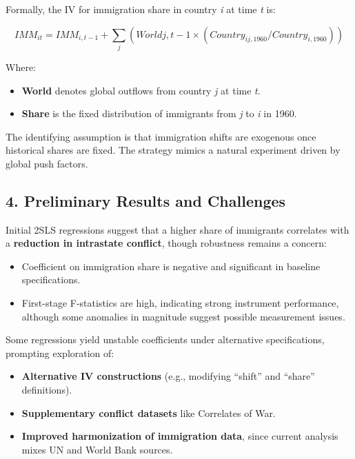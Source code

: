 \documentclass[
  letterpaper,
  DIV=11,
  numbers=noendperiod]{scrartcl}
\begin{document}
Formally, the IV for immigration share in country \emph{i} at time
\emph{t} is:

\[
IMM_{it} = IMM_{i,t-1} + \sum_j (World{j,t-1} × (Country_{ij,1960} / Country_{i,1960}))
\]

Where:

\begin{itemize}
\item
  \textbf{World} denotes global outflows from country \emph{j} at time
  \emph{t}.
\item
  \textbf{Share} is the fixed distribution of immigrants from \emph{j}
  to \emph{i} in 1960.
\end{itemize}

The identifying assumption is that immigration shifts are exogenous once
historical shares are fixed. The strategy mimics a natural experiment
driven by global push factors.

\subsection{4. Preliminary Results and
Challenges}\label{preliminary-results-and-challenges}

Initial 2SLS regressions suggest that a higher share of immigrants
correlates with a \textbf{reduction in intrastate conflict}, though
robustness remains a concern:

\begin{itemize}
\item
  Coefficient on immigration share is negative and significant in
  baseline specifications.
\item
  First-stage F-statistics are high, indicating strong instrument
  performance, although some anomalies in magnitude suggest possible
  measurement issues.
\end{itemize}

Some regressions yield unstable coefficients under alternative
specifications, prompting exploration of:

\begin{itemize}
\item
  \textbf{Alternative IV constructions} (e.g., modifying ``shift'' and
  ``share'' definitions).
\item
  \textbf{Supplementary conflict datasets} like Correlates of War.
\item
  \textbf{Improved harmonization of immigration data}, since current
  analysis mixes UN and World Bank sources.
\end{itemize}
\end{document}

